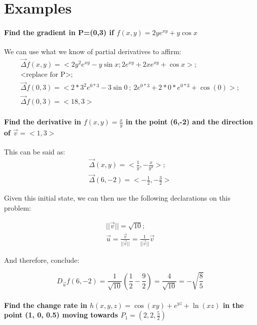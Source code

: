 \documentclass[11pt,fleqn]{book} %
\begin{document}
\section{Examples}

\paragraph*{Find the gradient in P=(0,3) if $f(x,y)=2ye^{xy}+ y \cos x$} 
We can use what we know of partial derivatives to affirm:
\begin{gather}
    \vec{\Delta}f(x,y) = <2y^2 e^{xy} - y \sin x ; 2e^{xy}+2xe^{xy} + \cos x>;\\
    \text{<replace for P>};\\
    \vec{\Delta}f(0,3) = <2*3^2 e^{0*3} - 3 \sin 0 \ ; \ 2e^{0*3} + 2* 0 *e^{0*3} + \cos (0)>;\\
    \vec{\Delta}f(0,3) = <18,3>
\end{gather}

\paragraph*{Find the derivative in $f(x,y) = \frac{x}{y}$ in the point
(6,-2) and the direction of $\vec{v} = <1,3>$} 

This can be said as:
\begin{gather}
    \vec{\Delta}(x,y) = <\frac{1}{y},-\frac{x}{y^2}>;\\
    \vec{\Delta}(6,-2) = <- \frac{1}{2},-\frac{3}{2}>
\end{gather}

Given this initial state, we can then use the following declarations on this problem:

\begin{gather}
    ||\vec{v}|| = \sqrt{10};\\
    \vec{u} = \frac{\vec{v}}{||\vec{v}||} = \frac{1}{||\vec{v}||} \vec{v}
\end{gather}

And therefore, conclude:

\begin{equation}
    D_{\vec{u}}f(6,-2) = \frac{1}{\sqrt{10}} (\frac{1}{2} - \frac{9}{2}) = \frac{4}{\sqrt{10}} = -\sqrt{\frac{8}{5}}
\end{equation}

\paragraph*{Find the change rate in $h(x,y,z) = \cos(xy)+e^{yz}+\ln(xz)$ in the point
(1, 0, 0.5) moving towards $P_1 = (2,2,\frac{5}{2})$} 
\end{document}

